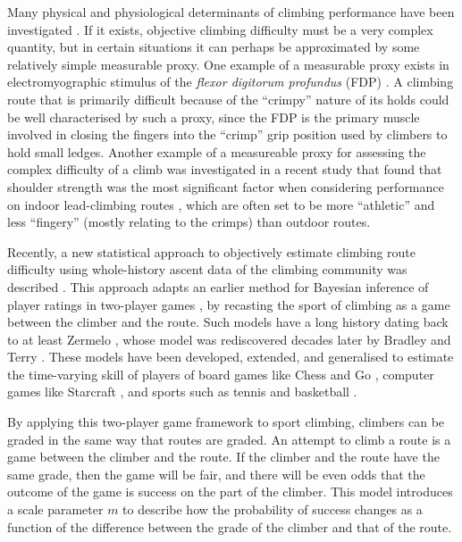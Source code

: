 \documentclass[12pt]{article}
\begin{document}
Many physical and physiological determinants of climbing performance have been investigated \citep{balavs2012hand, balavs2014relationship, mackenzie2020physical}. If it exists, objective climbing difficulty must be a very complex quantity, but in certain situations it can perhaps be approximated by some relatively simple measurable proxy.  One example of a measurable proxy exists in electromyographic stimulus of the {\it flexor digitorum profundus} (FDP) \citep{delignieres1993psychophysical}.  A climbing route that is primarily difficult because of the ``crimpy'' nature of its holds could be well characterised by such a proxy, since the FDP is the primary muscle involved in closing the fingers into the ``crimp'' grip position used by climbers to hold small ledges.  Another example of a measureable proxy for assessing the complex difficulty of a climb was investigated in a recent study that found that shoulder strength was the most significant factor when considering performance on indoor lead-climbing routes \citep{mackenzie2020physical}, which are often set to be more ``athletic'' and less ``fingery'' (mostly relating to the crimps) than outdoor routes.

Recently, a new statistical approach to objectively estimate climbing route difficulty using whole-history ascent data of the climbing community was described \citep{scarff2020estimation}. This approach adapts an earlier method for Bayesian inference of player ratings in two-player games \citep{coulom2008whole}, by recasting the sport of climbing as a game between the climber and the route. Such models have a long history dating back to at least Zermelo \citep{zermelo1929berechnung}, whose model was rediscovered decades later by Bradley and Terry \citep{bradley1952rank}. These models have been developed, extended, and generalised to estimate the time-varying skill of players of board games like Chess \citep{Elo1978, glickman1999rating} and Go \citep{coulom2008whole}, computer games like Starcraft \citep{maystre2019pairwise}, and sports such as tennis \citep{maystre2019pairwise} and basketball \citep{maystre2019pairwise}.

By applying this two-player game framework to sport climbing, climbers can be graded in the same way that routes are graded. An attempt to climb a route is a game between the climber and the route. If the climber and the route have the same grade, then the game will be fair, and there will be even odds that the outcome of the game is success on the part of the climber. This model introduces a scale parameter $m$ to describe how the probability of success changes as a function of the difference between the grade of the climber and that of the route.
\end{document}
